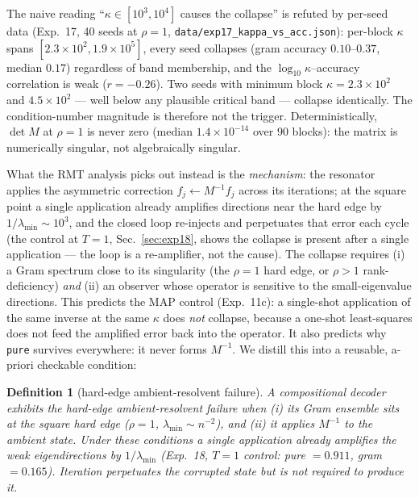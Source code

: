 \documentclass[11pt,a4paper]{article}
\newtheorem{definition}{Definition}
\begin{document}
The naive reading ``$\kappa \in [10^{3},10^{4}]$ causes the collapse'' is refuted by per-seed data (Exp.~17, 40 seeds at $\rho=1$, \texttt{data/exp17\_kappa\_vs\_acc.json}): per-block $\kappa$ spans $[2.3\times 10^{2}, 1.9\times 10^{5}]$, every seed collapses (gram accuracy $0.10$--$0.37$, median $0.17$) regardless of band membership, and the $\log_{10}\kappa$--accuracy correlation is weak ($r = -0.26$). Two seeds with minimum block $\kappa = 2.3\times 10^{2}$ and $4.5\times 10^{2}$ --- well below any plausible critical band --- collapse identically. The condition-number magnitude is therefore not the trigger. Deterministically, $\det M$ at $\rho=1$ is never zero (median $1.4\times 10^{-14}$ over 90 blocks): the matrix is numerically singular, not algebraically singular.

What the RMT analysis picks out instead is the \emph{mechanism}: the
resonator applies the asymmetric correction $f_j \leftarrow M^{-1} f_j$
across its iterations; at the square point a single application already
amplifies directions near the hard edge by $1/\lambda_{\min} \sim 10^{3}$, and the closed loop re-injects and perpetuates that error each cycle (the control at $T=1$, Sec.~\ref{sec:exp18}, shows the collapse is present after a single application --- the loop is a re-amplifier, not the cause). The collapse requires (i) a Gram spectrum close to its singularity (the $\rho=1$ hard edge, or $\rho>1$ rank-deficiency) \emph{and} (ii) an observer whose operator is sensitive to the small-eigenvalue directions. This
predicts the MAP control (Exp.~11c): a single-shot application of the same
inverse at the same $\kappa$ does \emph{not} collapse, because a one-shot least-squares does not feed the amplified error back into the operator. It also predicts why \texttt{pure} survives everywhere: it never
forms $M^{-1}$. We distill this into a reusable, a-priori checkable condition:

\begin{definition}[hard-edge ambient-resolvent failure]
\label{def:closure}
A compositional decoder exhibits the \emph{hard-edge ambient-resolvent failure} when (i) its Gram ensemble sits at the square hard edge ($\rho=1$, $\lambda_{\min} \sim n^{-2}$), and (ii) it applies $M^{-1}$ to the ambient state. Under these conditions a single application already amplifies the weak eigendirections by $1/\lambda_{\min}$ (Exp.~18, $T=1$ control: pure $=0.911$, gram $=0.165$). Iteration perpetuates the corrupted state but is not required to produce it.
\end{definition}
\end{document}
